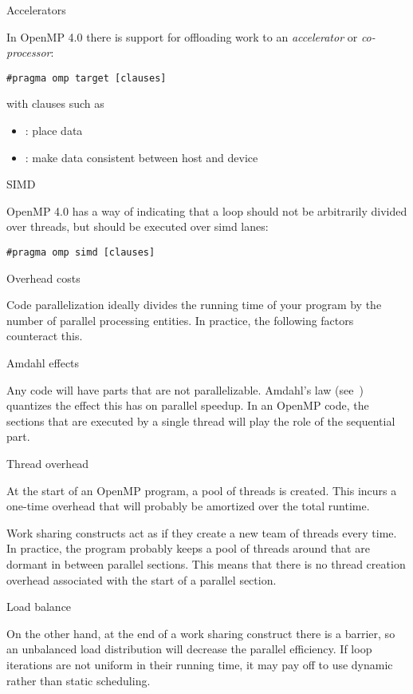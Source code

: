  {Accelerators}

In OpenMP 4.0 there is support for offloading work to an
\emph{accelerator}
or
\emph{co-processor}:
\begin{verbatim}
#pragma omp target [clauses]
\end{verbatim}
with clauses such as
\begin{itemize}
\item {}: place data
\item {}: make data consistent between host and device
\end{itemize}

 {SIMD}

OpenMP 4.0 has a way of indicating that a loop should not
be arbitrarily divided over threads, but should be executed
over simd lanes:
\begin{verbatim}
#pragma omp simd [clauses]
\end{verbatim}

 {Overhead costs}

Code parallelization ideally divides the running time of your program
by the number of parallel processing entities. In practice, the following
factors counteract this.

 {Amdahl effects}

Any code will have parts that are not parallelizable. Amdahl's law
(see~) quantizes the effect this has on parallel speedup.
In an OpenMP code, the sections that are executed by a single thread
will play the role of the sequential part.

 {Thread overhead}

At the start of an OpenMP program, a pool of threads is created. This
incurs a one-time overhead that will probably be amortized over the
total runtime.

Work sharing constructs act as if they create a new team of threads every time.
In practice, the program probably keeps a pool of threads around that are dormant
in between parallel sections. This means that there is no thread creation overhead
associated with the start of a parallel section.

 {Load balance}

On the other hand, at the end of a work sharing construct there is a barrier,
so an unbalanced load distribution will decrease the parallel efficiency.
If loop iterations are not uniform in their running time, it may pay off
to use dynamic rather than static scheduling.

